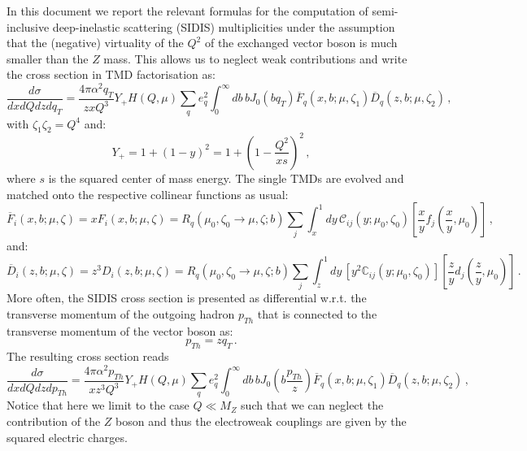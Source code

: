 \documentclass[10pt,a4paper]{article}
\begin{document}
In this document we report the relevant formulas for the computation
of semi-inclusive deep-inelastic scattering (SIDIS) multiplicities
under the assumption that the (negative) virtuality of the $Q^2$ of
the exchanged vector boson is much smaller than the $Z$ mass. This
allows us to neglect weak contributions and write the cross section
in TMD factorisation as:
\begin{equation}\label{eq:sidisxsec}
  \frac{d\sigma}{dxdQdz d q_T} = \frac{4\pi \alpha^2q_T}{z x Q^3}Y_+ H(Q,\mu) \sum_q e_q^2
  \int_0^\infty db \,b J_0\left(bq_T\right)\overline{F}_q(x,b;\mu,\zeta_1) \overline{D}_{q}(z,b;\mu,\zeta_2)\,,
\end{equation}
with $\zeta_1\zeta_2=Q^4$ and:
\begin{equation}
  Y_+=1+(1-y)^2=1+\left(1-\frac{Q^2}{xs}\right)^2\,,
\end{equation}
where $s$ is the squared center of mass energy. The single TMDs are
evolved and matched onto the respective collinear functions as usual:
\begin{equation}
\overline{F}_i(x,b;\mu,\zeta) =xF_i(x,b;\mu,\zeta) = R_q(\mu_0,\zeta_0\rightarrow \mu,\zeta;b) \sum_{j}\int_x^1dy\,\mathcal{C}_{ij}(y;\mu_0,\zeta_0)\left[\frac{x}{y}f_j\left(\frac{x}{y},\mu_0\right)\right]\,,
\end{equation}
and:
\begin{equation}
\overline{D}_{i}(z,b;\mu,\zeta) =z^3D_{i}(z,b;\mu,\zeta) = R_q(\mu_0,\zeta_0\rightarrow \mu,\zeta;b) \sum_{j}\int_z^1dy\,\left[y^2\mathbb{C}_{ij}(y;\mu_0,\zeta_0)\right]\left[\frac{z}{y}d_j\left(\frac{z}{y},\mu_0\right)\right]\,.
\end{equation}
More often, the SIDIS cross section is presented as differential
w.r.t. the transverse momentum of the outgoing hadron $p_{Th}$ that is
connected to the transverse momentum of the vector boson as:
\begin{equation}
p_{Th} = zq_T\,.
\end{equation}
The resulting cross section reads
\begin{equation}\label{eq:sidisxsec2}
  \frac{d\sigma}{dxdQdz d p_{Th}} = \frac{4\pi \alpha^2p_{Th}}{xz^3Q^3}Y_+ H(Q,\mu) \sum_q e_q^2
  \int_0^\infty db \,b J_0\left(b\frac{p_{Th}}{z}\right)\overline{F}_q(x,b;\mu,\zeta_1) \overline{D}_{q}(z,b;\mu,\zeta_2)\,,
\end{equation}
Notice that here we limit to the case $Q\ll M_Z$ such that we can
neglect the contribution of the $Z$ boson and thus the electroweak
couplings are given by the squared electric charges.
\end{document}
